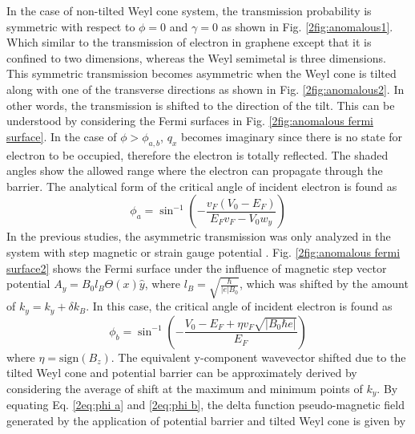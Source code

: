     In the case of non-tilted Weyl cone system, the transmission probability is symmetric with respect to $\phi = 0$ and $\gamma = 0$ as shown in Fig. \ref{2fig:anomalous1}.
    Which similar to the transmission of electron in graphene except that it is confined to two dimensions, whereas the Weyl semimetal is three dimensions.
    This symmetric transmission becomes asymmetric when the Weyl cone is tilted along with one of the transverse directions as shown in Fig. \ref{2fig:anomalous2}.
    In other words, the transmission is shifted to the direction of the tilt. 
    This can be understood by considering the Fermi surfaces in Fig. \ref{2fig:anomalous fermi surface}.
    In the case of $\phi > \phi_{a,b}$, $q_x$ becomes imaginary since there is no state for electron to be occupied, therefore the electron is totally reflected.
    The shaded angles show the allowed range where the electron can propagate through the barrier.
    The analytical form of the critical angle of incident electron is found as
    \begin{equation} \label{2eq:phi a}
        \phi_a = \sin^{-1}{\left(- \frac{v_F (V_0 - E_F)}{E_F v_F - V_0 w_y}\right)}
    \end{equation}
    In the previous studies, the asymmetric transmission was only analyzed in the system with step magnetic or strain gauge potential \cite{Pereira2009,Fujita2010,Wu2010}.
    Fig. \ref{2fig:anomalous fermi surface2} shows the Fermi surface under the influence of magnetic step vector potential $A_y = B_0 l_B \Theta (x)\hat{y}$, where $l_B = \sqrt{\frac{\hbar}{|e|B_0}}$, 
    which was shifted by the amount of $k_y = k_y + \delta k_B$.
    In this case, the critical angle of incident electron is found as
    \begin{equation} \label{2eq:phi b}
        \phi_b = \sin^{-1}{\left(-\frac{V_0 - E_F + \eta v_F \sqrt{|B_0 \hbar e|}}{E_F}\right)}
    \end{equation}
    where $\eta = \mathrm{sign}(B_z)$. The equivalent y-component wavevector shifted due to the tilted Weyl cone and potential barrier can be approximately derived by considering the average of shift
    at the maximum and minimum points of $k_y$.
    By equating Eq. \ref{2eq:phi a} and \ref{2eq:phi b}, the delta function pseudo-magnetic field generated by the application of potential barrier and tilted Weyl cone is given by


